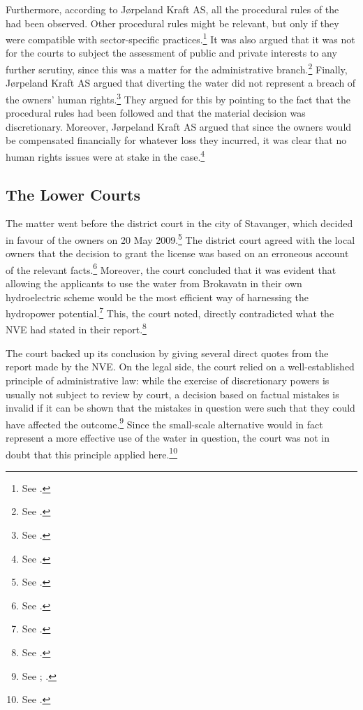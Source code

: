 {Furthermore, according to Jørpeland Kraft AS, all the procedural rules of the \cite{wra17} had been observed. Other procedural rules might be relevant, but only if they were compatible with sector-specific practices.\footnote{See \cite[16]{jorpeland11}.} It was also argued that it was not for the courts to subject the assessment of public and private interests to any further scrutiny, since this was a matter for the administrative branch.\footnote{See \cite[2]{jorpeland11a}.} Finally, Jørpeland Kraft AS argued that diverting the water did not represent a breach of the owners' human rights.\footnote{See \cite[2]{jorpeland11a}.} They argued for this by pointing to the fact that the procedural rules had been followed and that the material decision was discretionary. Moreover, Jørpeland Kraft AS argued that since the owners would be compensated financially for whatever loss they incurred, it was clear that no human rights issues were at stake in the case.\footnote{See \cite[2]{jorpeland11a}.}
}
\subsection{The Lower Courts}\label{sec:5:6:3}

The matter went before the district court in the city of Stavanger, which decided in favour of the owners on 20 May 2009.\footnote{See \cite{jorpeland09}.} The district court agreed with the local  owners that the decision to grant the license was based on an erroneous account of the relevant facts.\footnote{See \cite[25]{jorpeland11}.} Moreover, the court concluded that it was evident that allowing the applicants to use the water from Brokavatn in their own hydroelectric scheme would be the most efficient way of harnessing the hydropower potential.\footnote{See \cite[22-23]{jorpeland09}.} This, the court noted, directly contradicted what the NVE had stated in their report.\footnote{See \cite[23]{jorpeland09}.}

The court backed up its conclusion by giving several direct quotes from the report made by the NVE. On the legal side, the court relied on a well-established principle of administrative law: while the exercise of discretionary powers is usually not subject to review by court, a decision based on factual mistakes is invalid if it can be shown that the mistakes in question were such that they could have affected the outcome.\footnote{See \dni\cite[41]{paa67}; \cite[407-410]{eckhoff14}.} Since the small-scale alternative would in fact represent a more effective use of the water in question, the court was not in doubt that this principle applied here.\footnote{See \cite[25]{jorpeland09}.}

